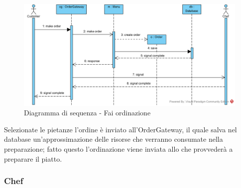 \begin{figure}[H]
	\centering
	\includegraphics[width=14cm]{../../documenti/SpecificaTecnica/diagrammi_img/sequenza/cliente_fai_ordinazione.png}
	\caption{Diagramma di sequenza - Fai ordinazione}
\end{figure}
Selezionate le pietanze l'ordine è inviato all'Order\-Gateway, il quale salva nel database un'approssimazione delle risorse che verranno consumate nella preparazione; fatto questo l'ordinazione viene inviata allo \Chef{} che provvederà a preparare il piatto.

\subsubsection{Chef}

